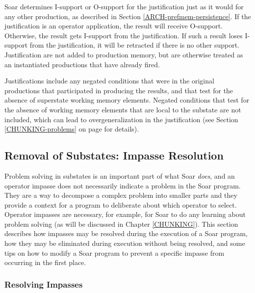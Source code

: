 Soar determines I-support or O-support for the justification just as it
would for any other production, as described in Section
\ref{ARCH-prefmem-persistence}.  If the justification is an operator
application, the result will receive O-support.  Otherwise, the result
gets I-support from the justification. If such a result loses
I-support from the justification, it will be retracted if there is no
other support.  Justification are not added to production memory, but
are otherwise treated as an instantiated productions that have already
fired.

Justifications include any negated conditions that were in the original
productions that participated in producing the results, and that test for
the absence of superstate working memory elements. Negated conditions that
test for the absence of working memory elements that are local to the
substate are not included, which can lead to overgeneralization
in the justification (see Section \ref{CHUNKING-problems} on page
\pageref{CHUNKING-problems} for details). 

\subsection{Removal of Substates: Impasse Resolution}
\label{ARCH-impasses-elimination}

Problem solving in substates is an important part of what Soar
\textit{does}, and an operator impasse does not necessarily indicate a
problem in the Soar program.  They are a way to decompose a complex
problem into smaller parts and they provide a context for a program to
deliberate about which operator to select.  Operator impasses are necessary, for
example, for Soar to do any learning about problem solving (as will be
discussed in Chapter \ref{CHUNKING}). This section describes how
impasses may be resolved during the execution of a Soar program, how
they may be eliminated during execution without being resolved, and some
tips on how to modify a Soar program to prevent a specific impasse from
occurring in the first place.  

\subsubsection*{Resolving Impasses}

